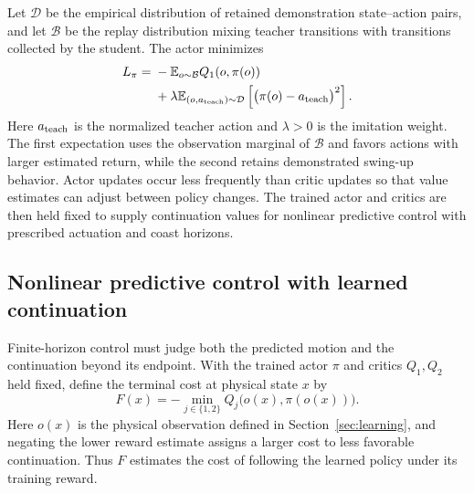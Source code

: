 \documentclass[letterpaper,10pt,conference]{ieeeconf}
\begin{document}
Let $\mathcal D$ be the empirical distribution of retained demonstration state--action pairs, and let $\mathcal B$ be the replay distribution mixing teacher transitions with transitions collected by the student. The actor minimizes
\begin{equation}
\begin{aligned}
 L_\pi={}&-\mathbb E_{o\sim\mathcal B}Q_1(o,\pi(o))\\
 &+\lambda\mathbb E_{(o,a_{\rm teach})\sim\mathcal D}
 \left[\bigl(\pi(o)-a_{\rm teach}\bigr)^2\right].
\end{aligned}
\label{eq:actor-loss}
\end{equation}
Here $a_{\rm teach}$ is the normalized teacher action and $\lambda>0$ is the imitation weight. The first expectation uses the observation marginal of $\mathcal B$ and favors actions with larger estimated return, while the second retains demonstrated swing-up behavior. Actor updates occur less frequently than critic updates so that value estimates can adjust between policy changes. The trained actor and critics are then held fixed to supply continuation values for nonlinear predictive control with prescribed actuation and coast horizons.

\subsection{Nonlinear predictive control with learned continuation}
\label{sec:mpc-rl}
Finite-horizon control must judge both the predicted motion and the continuation beyond its endpoint. With the trained actor $\pi$ and critics $Q_1,Q_2$ held fixed, define the terminal cost at physical state $x$ by
\begin{equation}
 F(x)=-\min_{j\in\{1,2\}}Q_j\bigl(o(x),\pi(o(x))\bigr).
\label{eq:terminal-value}
\end{equation}
Here $o(x)$ is the physical observation defined in Section~\ref{sec:learning}, and negating the lower reward estimate assigns a larger cost to less favorable continuation. Thus $F$ estimates the cost of following the learned policy under its training reward.
\end{document}

